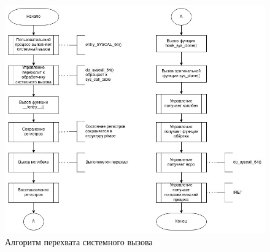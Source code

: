 \begin{figure}[h]
	\begin{center}
		\includegraphics[scale=0.6]{img/ftrace_algo.jpg}
	\end{center}
	\caption{Алгоритм перехвата системного вызова}
	\label{fig:ftrace_algo}
\end{figure}

